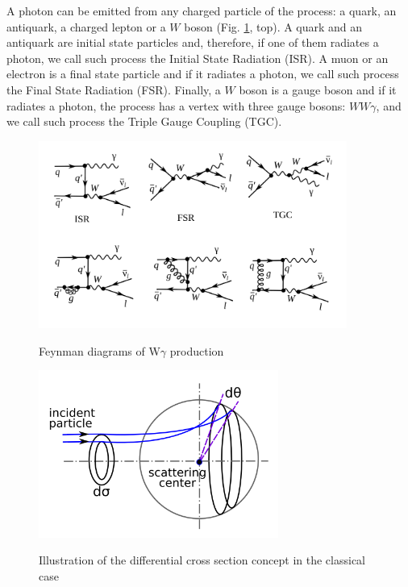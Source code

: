 
A photon can be emitted from any charged particle of the process: a quark, an antiquark, a charged lepton or a $W$ boson (Fig. \ref{fig:feynmWg_LO_NLO}, top). A quark and an antiquark are initial state particles and, therefore, if one of them radiates a photon, we call such process the Initial State Radiation (ISR). A muon or an electron is a final state particle and if it radiates a photon, we call such process the Final State Radiation (FSR). Finally, a $W$ boson is a gauge boson and if it radiates a photon, the process has a vertex with three gauge bosons: $WW\gamma$, and we call such process the Triple Gauge Coupling (TGC).\\

\begin{figure}[htb]
  \begin{center}
    {\includegraphics[width=0.90\textwidth]{../figs/WgAbout/feynmWg_LO_NLO.png}}
    \caption{Feynman diagrams of W$\gamma$ production}
    \label{fig:feynmWg_LO_NLO}
  \end{center}
\end{figure}


\begin{figure}[htb]
  \begin{center}
    {\includegraphics[width=0.70\textwidth]{../figs/WgAbout/CSclassical.png}}
    \caption{Illustration of the differential cross section concept in the classical case}
    \label{fig:CSclassical}
  \end{center}
\end{figure}

